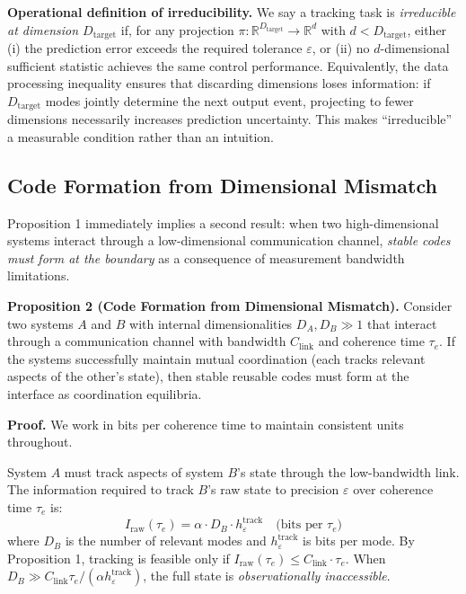 \documentclass[12pt]{article}
\begin{document}
\textbf{Operational definition of irreducibility.} We say a tracking task is \textit{irreducible at dimension $D_{\text{target}}$} if, for any projection $\pi: \mathbb{R}^{D_{\text{target}}} \to \mathbb{R}^d$ with $d < D_{\text{target}}$, either (i) the prediction error exceeds the required tolerance $\varepsilon$, or (ii) no $d$-dimensional sufficient statistic achieves the same control performance. Equivalently, the data processing inequality ensures that discarding dimensions loses information: if $D_{\text{target}}$ modes jointly determine the next output event, projecting to fewer dimensions necessarily increases prediction uncertainty. This makes ``irreducible'' a measurable condition rather than an intuition.

\subsection{Code Formation from Dimensional Mismatch}
\label{sec:code_formation}

Proposition 1 immediately implies a second result: when two high-dimensional systems interact through a low-dimensional communication channel, \textit{stable codes must form at the boundary} as a consequence of measurement bandwidth limitations.

\textbf{Proposition 2 (Code Formation from Dimensional Mismatch).} Consider two systems $A$ and $B$ with internal dimensionalities $D_A, D_B \gg 1$ that interact through a communication channel with bandwidth $C_{\text{link}}$ and coherence time $\tau_e$. If the systems successfully maintain mutual coordination (each tracks relevant aspects of the other's state), then stable reusable codes must form at the interface as coordination equilibria.

\textbf{Proof.} We work in bits per coherence time to maintain consistent units throughout.

System $A$ must track aspects of system $B$'s state through the low-bandwidth link. The information required to track $B$'s raw state to precision $\varepsilon$ over coherence time $\tau_e$ is:
\begin{equation}
I_{\text{raw}}(\tau_e) = \alpha \cdot D_B \cdot h_\varepsilon^{\text{track}} \quad \text{(bits per $\tau_e$)}
\end{equation}
where $D_B$ is the number of relevant modes and $h_\varepsilon^{\text{track}}$ is bits per mode. By Proposition 1, tracking is feasible only if $I_{\text{raw}}(\tau_e) \le C_{\text{link}} \cdot \tau_e$. When $D_B \gg C_{\text{link}} \tau_e / (\alpha h_\varepsilon^{\text{track}})$, the full state is \textit{observationally inaccessible}.
\end{document}
